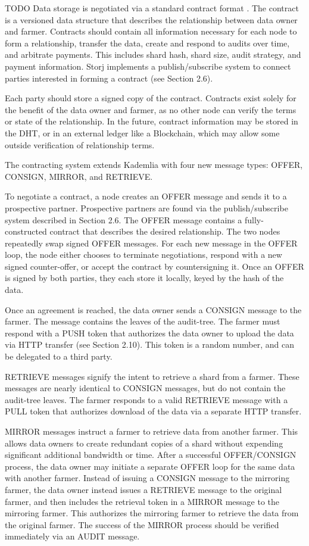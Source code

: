 \documentclass[a4paper,10pt]{article}
\newcommand{\todo}[1]{{\color{red} TODO #1}}
\begin{document}
\todo{
Data storage is negotiated via a standard contract format \cite{7}. The contract
is a versioned data structure that describes the relationship between data owner
and farmer. Contracts should contain all information necessary for each node to
form a relationship, transfer the data, create and respond to audits over time,
and arbitrate payments. This includes shard hash, shard size, audit strategy,
and payment information. Storj implements a publish/subscribe system to connect
parties interested in forming a contract (see Section 2.6).

Each party should store a signed copy of the contract. Contracts exist solely
for the benefit of the data owner and farmer, as no other node can verify the
terms or state of the relationship. In the future, contract information may be
stored in the DHT, or in an external ledger like a Blockchain, which may allow
some outside verification of relationship terms.

The contracting system extends Kademlia with four new message types: OFFER,
CONSIGN, MIRROR, and RETRIEVE.

To negotiate a contract, a node creates an OFFER message and sends it to a
prospective partner. Prospective partners are found via the publish/subscribe
system described in Section 2.6. The OFFER message contains a fully-constructed
contract that describes the desired relationship. The two nodes repeatedly swap
signed OFFER messages. For each new message in the OFFER loop, the node either
chooses to terminate negotiations, respond with a new signed counter-offer, or
accept the contract by countersigning it. Once an OFFER is signed by both
parties, they each store it locally, keyed by the hash of the data.

Once an agreement is reached, the data owner sends a CONSIGN message to the
farmer. The message contains the leaves of the audit-tree. The farmer must
respond with a PUSH token that authorizes the data owner to upload the data via
HTTP transfer (see Section 2.10). This token is a random number, and can be
delegated to a third party.

RETRIEVE messages signify the intent to retrieve a shard from a farmer. These
messages are nearly identical to CONSIGN messages, but do not contain the
audit-tree leaves. The farmer responds to a valid RETRIEVE message with a PULL
token that authorizes download of the data via a separate HTTP transfer.

MIRROR messages instruct a farmer to retrieve data from another farmer. This
allows data owners to create redundant copies of a shard without expending
significant additional bandwidth or time. After a successful OFFER/CONSIGN
process, the data owner may initiate a separate OFFER loop for the same data
with another farmer. Instead of issuing a CONSIGN message to the mirroring
farmer, the data owner instead issues a RETRIEVE message to the original farmer,
and then includes the retrieval token in a MIRROR message to the mirroring
farmer. This authorizes the mirroring farmer to retrieve the data from the
original farmer. The success of the MIRROR process should be verified
immediately via an AUDIT message.
}
\end{document}
